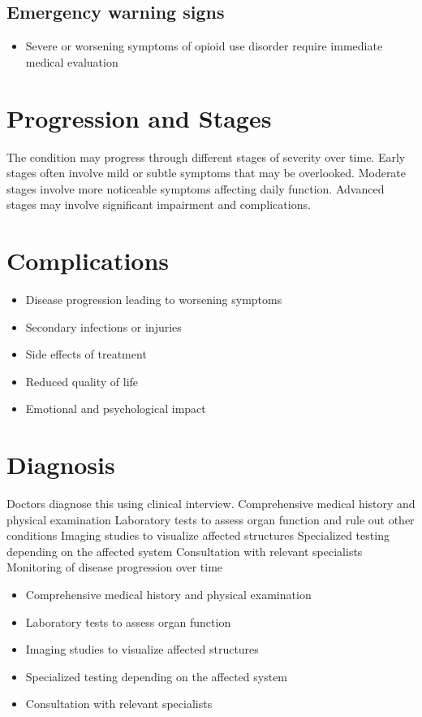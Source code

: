 \subsection{Emergency warning signs}
\begin{itemize}[noitemsep]
  \item Severe or worsening symptoms of opioid use disorder require immediate medical evaluation
\end{itemize}
\section{Progression and Stages}
The condition may progress through different stages of severity over time. Early stages often involve mild or subtle symptoms that may be overlooked. Moderate stages involve more noticeable symptoms affecting daily function. Advanced stages may involve significant impairment and complications.
\section{Complications}
\begin{itemize}[noitemsep]
  \item Disease progression leading to worsening symptoms
  \item Secondary infections or injuries
  \item Side effects of treatment
  \item Reduced quality of life
  \item Emotional and psychological impact
\end{itemize}
\section{Diagnosis}
Doctors diagnose this using clinical interview. Comprehensive medical history and physical examination Laboratory tests to assess organ function and rule out other conditions Imaging studies to visualize affected structures Specialized testing depending on the affected system Consultation with relevant specialists Monitoring of disease progression over time

\begin{itemize}[noitemsep]
  \item Comprehensive medical history and physical examination
  \item Laboratory tests to assess organ function
  \item Imaging studies to visualize affected structures
  \item Specialized testing depending on the affected system
  \item Consultation with relevant specialists
\end{itemize}
